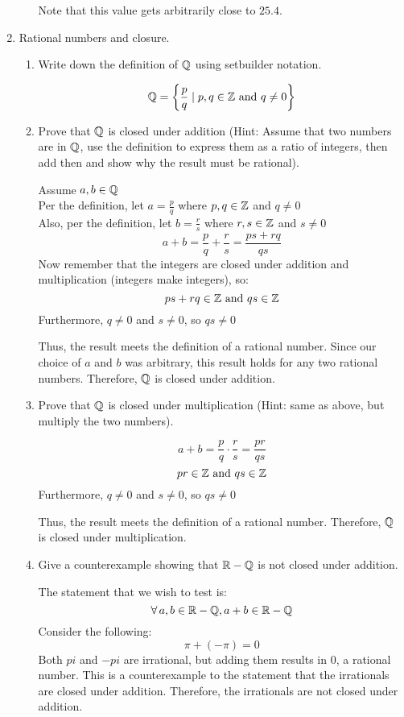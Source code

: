 \documentclass[letterpaper,12pt,fleqn]{article}
\begin{document}
\begin{enumerate}
\begin{enumerate}
  Note that this value gets arbitrarily close to $25.4$.
\end{enumerate}

\item Rational numbers and closure.
  \begin{enumerate}
  \item Write down the definition of $\mathbb{Q}$ using setbuilder notation.

    \[\Q=\left\{\frac{p}{q}\mid p,q\in\Z\ \mbox{and}\ q\ne0\right\}\]
    
  \item Prove that $\mathbb{Q}$ is closed under addition (Hint: Assume that two numbers
    are in $\mathbb{Q}$, use the definition to express them as a ratio of integers,
    then add then and show why the result must be rational).

    Assume $a,b\in\mathbb{Q}$ \\
    Per the definition, let $a=\frac{p}{q}$ where $p,q\in\mathbb{Z}$ and $q\ne0$ \\
    Also, per the definition, let $b=\frac{r}{s}$ where $r,s\in\mathbb{Z}$ and
    $s\ne0$
    \[a+b=\frac{p}{q}+\frac{r}{s}=\frac{ps+rq}{qs}\]
    Now remember that the integers are closed under addition and multiplication
    (integers make integers), so: \\
    \[ps+rq\in\mathbb{Z}\ \mbox{and}\ qs\in\mathbb{Z}\]
    Furthermore, $q\ne0$ and $s\ne0$, so $qs\ne0$
    
    Thus, the result meets the definition of a rational number. Since our
    choice of $a$ and $b$ was arbitrary, this result holds for any two
    rational numbers.  Therefore, $\mathbb{Q}$ is closed under addition.
    \newpage
  \item Prove that $\mathbb{Q}$ is closed under multiplication (Hint: same as above,
    but multiply the two numbers).

    \[a+b=\frac{p}{q}\cdot\frac{r}{s}=\frac{pr}{qs}\]
    \[pr\in\mathbb{Z}\ \mbox{and}\ qs\in\mathbb{Z}\]
    Furthermore, $q\ne0$ and $s\ne0$, so $qs\ne0$

    Thus, the result meets the definition of a rational number. Therefore, $\mathbb{Q}$
    is closed under multiplication.

  \item Give a counterexample showing that $\mathbb{R}-\mathbb{Q}$ is not closed under addition.

    The statement that we wish to test is:
    \[\forall\,a,b\in\mathbb{R}-\mathbb{Q},a+b\in\mathbb{R}-\mathbb{Q}\]
    Consider the following:
    \[\pi+(-\pi)=0\]
    Both $pi$ and $-pi$ are irrational, but adding them results in $0$, a
    rational number.  This is a counterexample to the statement that the
    irrationals are closed under addition. Therefore, the irrationals are not
    closed under addition.
    

\end{enumerate}
\end{enumerate}
\end{document}
